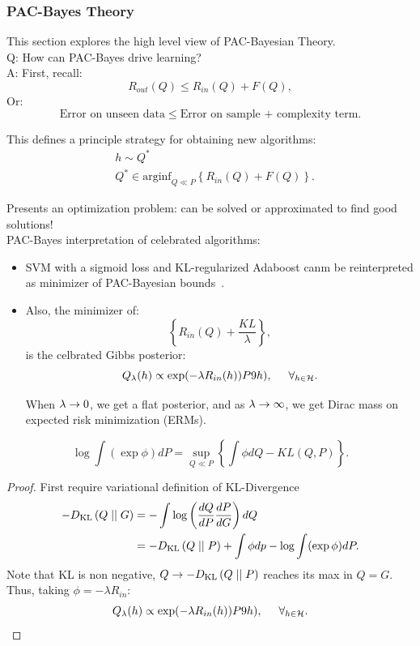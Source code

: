 \subsubsection{PAC-Bayes Theory}
This section explores the high level view of PAC-Bayesian Theory. \\

Q: How can PAC-Bayes drive learning? \\

A: First, recall:
\begin{equation}
    R_{out}(Q) \leq R_{in}(Q) + F(Q),
\end{equation}
Or:
\begin{equation}
    \text{Error on unseen data} \leq \text{Error on sample + complexity term}.
\end{equation}

This defines a principle strategy for obtaining new algorithms:
\begin{align}
    &h \sim Q^* \\
    &Q^* \in \text{arginf}_{Q \ll P} \left\{R_{in}(Q) + F(Q)\right\}.
\end{align}

Presents an optimization problem: can be solved or approximated to find good solutions! \\

PAC-Bayes interpretation of celebrated algorithms: 
\begin{itemize}
    \item SVM with a sigmoid loss and KL-regularized Adaboost canm be reinterpreted as minimizer of PAC-Bayesian bounds~\cite{ambroladze2007tighter}.
    \item Also, the minimizer of:
    \[
    \left\{R_{in}(Q) + \frac{KL}{\lambda}\right\},
    \]
    is the celbrated Gibbs posterior:
    \[
    Q_\lambda(h) \propto \exp(-\lambda R_{in}(h)) P9h), \hspace{5mm} \forall_{h \in \mathcal{H}}.
    \]
    
    When $\lambda \rightarrow 0$, we get a flat posterior, and as $\lambda \rightarrow \infty$, we get Dirac mass on expected risk minimization (ERMs).
\end{itemize}



\begin{theorem}
\[
\log \int (\exp \phi) dP = \sup_{Q \ll P} \left\{ \int \phi dQ - KL(Q,P)\right\}.
\]
\end{theorem}
\begin{proof}
First require variational definition of KL-Divergence~\cite{csiszar1975divergence}
\begin{align}
    -D_{\text{KL}}\left(Q \mid \mid G\right) &= - \int \log\left(\frac{dQ}{dP} \frac{dP}{dG}\right) dQ \\
    &= -D_{\text{KL}}\left(Q \mid \mid P\right) + \int \phi dp - \log \int(\exp \phi) dP.
\end{align}
Note that KL is non negative, $Q \rightarrow -D_{\text{KL}}\left(Q \mid \mid P\right)$ reaches its max in $Q=G$. Thus, taking $\phi = -\lambda R_{in}$:
\[
Q_\lambda(h) \propto \exp(-\lambda R_{in}(h)) P9h), \hspace{5mm} \forall_{h \in \mathcal{H}}. \qedhere
\]
\end{proof}

